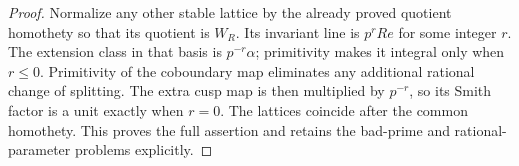 \begin{proof}
Normalize any other stable lattice by the already proved
quotient homothety so that its quotient is $W_R$.
Its invariant line is $p^rRe$ for some integer $r$.
The extension class in that basis is $p^{-r}\alpha$;
primitivity makes it integral only when $r\leq0$.
Primitivity of the coboundary map eliminates any additional
rational change of splitting.  The extra cusp map is then
multiplied by $p^{-r}$, so its Smith factor is a unit exactly
when $r=0$.  The lattices coincide after the common homothety.
This proves the full assertion and retains the bad-prime
and rational-parameter problems explicitly.
\end{proof}

